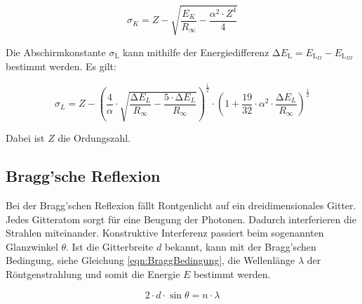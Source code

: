 \begin{equation}
    \sigma_K = Z - \sqrt{\frac{E_K}{R_\infty} - \frac{\alpha^2 \cdot Z^4}{4}}
\end{equation}

Die Abschirmkonstante $\sigma_\text{L}$ kann mithilfe der Energiedifferenz $\increment E_\text{L} = E_\text{L}_{II} -E_\text{L}_{III}$ bestimmt werden.
Es gilt:

\begin{equation}
    \sigma_L = Z -( \frac{4}{\alpha} \cdot \sqrt{\frac{\increment E_L}{R_\infty} - \frac{5 \cdot \increment E_L}{R_\infty}})^{\frac{1}{2}}
                \cdot (1 + \frac{19}{32} \cdot \alpha^2 \cdot \frac{\increment E_L}{R_\infty})^{\frac{1}{2}}
\end{equation}

Dabei ist $Z$ die Ordungszahl.

\subsection{Bragg'sche Reflexion}
\label{subsec:Bragg}

Bei der Bragg'schen Reflexion fällt Rontgenlicht auf ein dreidimensionales Gitter.
Jedes Gitteratom sorgt für eine Beugung der Photonen.
Dadurch interferieren die Strahlen miteinander.
Konstruktive Interferenz passiert beim sogenannten Glanzwinkel $\theta$.
Ist die Gitterbreite $d$ bekannt, kann mit der Bragg'schen Bedingung, siehe Gleichung \eqref{eqn:BraggBedingung},
die Wellenlänge $\lambda$ der Röntgenstrahlung und somit die Energie $E$ bestimmt werden.

\begin{equation}
    \label{eqn:BraggBedingung}
    2 \cdot d \cdot \sin\theta = n \cdot \lambda
\end{equation}